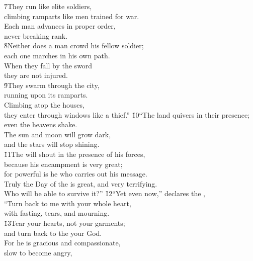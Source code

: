 \begin{poetry}
\poeml \v{7}They run like elite soldiers, \\
\poemll    climbing ramparts like men trained for war. \\
\poeml Each man advances in proper order, \\
\poemll    never breaking rank. \\
\poeml \v{8}Neither does a man crowd his fellow soldier; \\
\poemll    each one marches in his own path. \\
\poeml When they fall by the sword \\
\poemll    they are not injured. \\
\poeml \v{9}They swarm through the city, \\
\poemll    running upon its ramparts. \\
\poeml Climbing atop the houses, \\
\poemll    they enter through windows like a thief.''
\poeml \v{10}``The land quivers in their presence; \\
\poemll    even the heavens shake. \\
\poeml The sun and moon will grow dark, \\
\poemll    and the stars will stop shining. \\
\poeml \v{11}The  will shout in the presence of his forces, \\
\poemll    because his encampment is very great; \\
\poeml for powerful is he who carries out his message. \\
\poemll    Truly the Day of the  is great, and very terrifying. \\
\poemlll       Who will be able to survive it?''
\poeml \v{12}``Yet even now,'' declares the , \\
\poemll    ``Turn back to me with your whole heart, \\
\poemlll       with fasting, tears, and mourning. \\
\poeml \v{13}Tear your hearts, not your garments; \\
\poemll    and turn back to the  your God. \\
\poeml For he is gracious and compassionate, \\
\poemll    slow to become angry, \\

\end{poetry}
